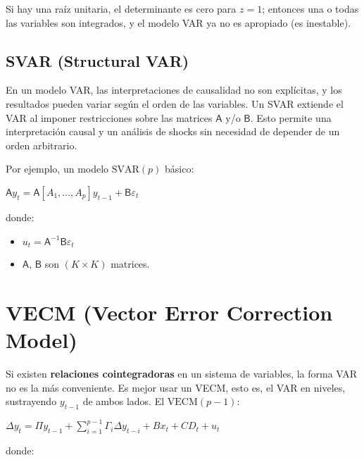 \documentclass[10pt, a4paper, landscape]{article}
\begin{document}
\begin{multicols}{2}
Si hay una raíz unitaria, el determinante es cero para \( z = 1 \); entonces una o todas las variables son integrados, y el modelo VAR ya no es apropiado (es inestable).

\subsection*{SVAR (Structural VAR)}

En un modelo VAR, las interpretaciones de causalidad no son explícitas, y los resultados pueden variar según el orden de las variables. Un SVAR extiende el VAR al imponer restricciones sobre las matrices \( \mathsf{A} \) y/o \( \mathsf{B} \). Esto permite una interpretación causal y un análisis de shocks sin necesidad de depender de un orden arbitrario.

Por ejemplo, un modelo \( \text{SVAR}(p) \) básico:

\begin{center}
	\( \mathsf{A} y_t = \mathsf{A} [A_1, \ldots, A_p] y_{t - 1} + \mathsf{B} \varepsilon_t \)
\end{center}

donde:

\begin{itemize}[leftmargin=*]
	\item \( u_t = \mathsf{A}^{-1} \mathsf{B} \varepsilon_t \)
	\item \( \mathsf{A} \), \( \mathsf{B} \) son \( (K \times K) \) matrices.
\end{itemize}

\columnbreak

\section*{VECM (Vector Error Correction Model)}

Si existen \textbf{relaciones cointegradoras} en un sistema de variables, la forma VAR no es la más conveniente. Es mejor usar un VECM, esto es, el VAR en niveles, sustrayendo \( y_{t - 1} \) de ambos lados. El \( \text{VECM}(p - 1) \):

\begin{center}
	\( \Delta y_{t} = \Pi y_{t - 1} + \sum_{i = 1}^{p - 1} \Gamma_{i} \Delta y_{t - i} + B x_{t} + CD_{t} + u_{t} \)
\end{center}

donde:


\end{multicols}
\end{document}
